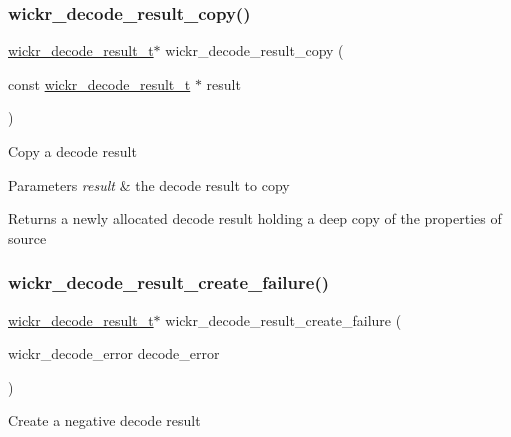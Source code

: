 \subsubsection{\texorpdfstring{wickr\+\_\+decode\+\_\+result\+\_\+copy()}{wickr\_decode\_result\_copy()}}
{\footnotesize\ttfamily \hyperlink{structwickr__decode__result}{wickr\+\_\+decode\+\_\+result\+\_\+t}$\ast$ wickr\+\_\+decode\+\_\+result\+\_\+copy (\begin{DoxyParamCaption}\item[{const \hyperlink{structwickr__decode__result}{wickr\+\_\+decode\+\_\+result\+\_\+t} $\ast$}]{result }\end{DoxyParamCaption})}

Copy a decode result


\begin{DoxyParams}{Parameters}
{\em result} & the decode result to copy \\
\hline
\end{DoxyParams}
\begin{DoxyReturn}{Returns}
a newly allocated decode result holding a deep copy of the properties of \textquotesingle{}source\textquotesingle{} 
\end{DoxyReturn}
\mbox{\label{group__wickr__protocol_ga2bd6f49ed993d2290aaafa514eba43ed}} 
\subsubsection{\texorpdfstring{wickr\+\_\+decode\+\_\+result\+\_\+create\+\_\+failure()}{wickr\_decode\_result\_create\_failure()}}
{\footnotesize\ttfamily \hyperlink{structwickr__decode__result}{wickr\+\_\+decode\+\_\+result\+\_\+t}$\ast$ wickr\+\_\+decode\+\_\+result\+\_\+create\+\_\+failure (\begin{DoxyParamCaption}\item[{wickr\+\_\+decode\+\_\+error}]{decode\+\_\+error }\end{DoxyParamCaption})}

Create a negative decode result


